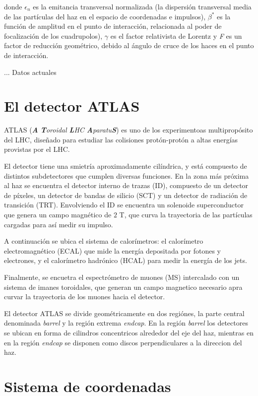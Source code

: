 donde $\epsilon_{n}$ es la emitancia transversal normalizada (la dispersión transversal media de las partículas del  haz en el espacio de coordenadas e impulsos), $\beta^{*}$ es la función de amplitud en el punto de interacción, relacionada al poder de focalización de los cuadrupolos), $\gamma$ es el factor relativista de Lorentz y \textit{F} es un factor de reducción geométrico, debido al ángulo de cruce de los haces en el punto de interacción.

... Datos actuales

\section{El detector ATLAS}

ATLAS (\textit{\textbf{A} \textbf{T}oroidal \textbf{L}HC \textbf{A}paratu\textbf{S}})  \cite{PERF-2007-01} es uno de los experimentoas multipropósito del LHC, diseñado para estudiar las colisiones protón-protón a altas energías provistas por el LHC.

El detector tiene una smietría aproximadamente cilíndrica, y está compuesto de distintos subdetectores que cumplen diversas funciones. En la zona más próxima al haz se encuentra el detector interno de trazas (ID), compuesto de un detector de píxeles, un detector de bandas de silicio (SCT) y un detector de radiación de transición (TRT). Envolviendo el ID se encuentra un solenoide superconductor que genera un campo magnético de $2$ T, que curva la trayectoria de las partículas cargadas para así medir su impulso.

A continuación se ubica el sistema de calorímetros: el calorímetro electromagnético (ECAL) que mide la energía depositada por fotones y electrones, y el calorímetro hadrónico (HCAL) para medir la energía de los jets.

Finalmente, se encuetra el espectrómetro de muones (MS) intercalado con un sistema de imanes toroidales, que generan un campo magnetico necesario apra curvar la trayectoria de los muones hacia el detector.

El detector ATLAS se divide geométricamente en dos regiónes, la parte central denominada \textit{barrel} y la región extrema \textit{endcap}. En la región \textit{barrel} los detectores se ubican en forma de cilindros concentricos alrededor del eje del haz, mientras en en la región \textit{endcap} se disponen como discos perpendiculares a la direccion del haz. 

\section{Sistema de coordenadas}

